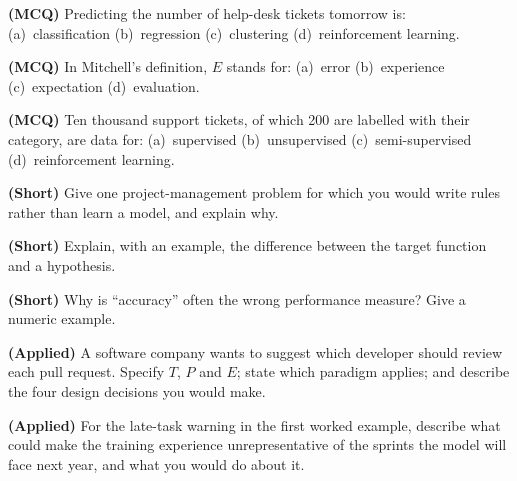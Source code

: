 \begin{reviewq}
  \item \textbf{(MCQ)} Predicting the number of help-desk tickets tomorrow is:
        (a)~classification (b)~regression (c)~clustering (d)~reinforcement
        learning.
  \item \textbf{(MCQ)} In Mitchell's definition, $E$ stands for: (a)~error
        (b)~experience (c)~expectation (d)~evaluation.
  \item \textbf{(MCQ)} Ten thousand support tickets, of which 200 are labelled
        with their category, are data for: (a)~supervised (b)~unsupervised
        (c)~semi-supervised (d)~reinforcement learning.
  \item \textbf{(Short)} Give one project-management problem for which you would
        write rules rather than learn a model, and explain why.
  \item \textbf{(Short)} Explain, with an example, the difference between the
        target function and a hypothesis.
  \item \textbf{(Short)} Why is ``accuracy'' often the wrong performance measure?
        Give a numeric example.
  \item \textbf{(Applied)} A software company wants to suggest which developer
        should review each pull request. Specify $T$, $P$ and $E$; state which
        paradigm applies; and describe the four design decisions you would make.
  \item \textbf{(Applied)} For the late-task warning in the first worked example,
        describe what could make the training experience unrepresentative of the
        sprints the model will face next year, and what you would do about it.
\end{reviewq}
